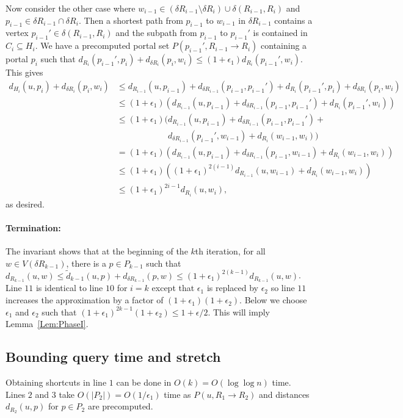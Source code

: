 \documentclass[11pt]{article}
\begin{document}
Now consider the other case where $w_{i-1}\in (\delta R_{i-1}\setminus\delta R_i)\cup\delta(R_{i-1},R_i)$ and $p_{i-1}\in\delta R_{i-1}\cap\delta R_i$. Then a shortest path from $p_{i-1}$ to $w_{i-1}$ in $\delta R_{i-1}$ contains a vertex $p_{i-1}'\in\delta(R_{i-1},R_i)$ and the subpath from $p_{i-1}$ to $p_{i-1}'$ is contained in $C_i\subseteq H_i$. We have a precomputed portal set $P(p_{i-1}',R_{i-1}\rightarrow R_i)$ containing a portal $p_i$ such that $d_{R_i}(p_{i-1}',p_i) + d_{\delta R_i}(p_i,w_i) \leq (1+\epsilon_1)d_{R_i}(p_{i-1}',w_i)$. This gives
\begin{align*}
  d_{H_i}(u,p_i) + d_{\delta R_i}(p_i,w_i) & \leq d_{R_{i-1}}(u,p_{i-1}) + d_{\delta R_{i-1}}(p_{i-1},p_{i-1}') + d_{R_i}(p_{i-1}',p_i) + d_{\delta R_i}(p_i,w_i)\\
  & \leq (1+\epsilon_1)(d_{R_{i-1}}(u,p_{i-1}) + d_{\delta R_{i-1}}(p_{i-1},p_{i-1}') + d_{R_i}(p_{i-1}',w_i))\\
  & \leq (1+\epsilon_1)(d_{R_{i-1}}(u,p_{i-1}) + d_{\delta R_{i-1}}(p_{i-1},p_{i-1}') +{}\\
  & \phantom{{}\leq  (1+\epsilon_1)(}d_{\delta R_{i-1}}(p_{i-1}',w_{i-1}) + d_{R_i}(w_{i-1},w_i))\\
  & =    (1+\epsilon_1)(d_{R_{i-1}}(u,p_{i-1}) + d_{\delta R_{i-1}}(p_{i-1},w_{i-1}) + d_{R_i}(w_{i-1},w_i))\\
  & \leq (1+\epsilon_1)((1+\epsilon_1)^{2(i-1)}d_{R_{i-1}}(u,w_{i-1}) + d_{R_i}(w_{i-1},w_i))\\
  & \leq (1+\epsilon_1)^{2i-1}d_{R_i}(u,w_i),
\end{align*}
as desired.

\paragraph{Termination:} The invariant shows that at the beginning of the $k$th iteration, for all $w\in V(\delta R_{k-1})$, there is a $p\in P_{k-1}$ such that $d_{R_{k-1}}(u,w)\leq \tilde{d}_{k-1}(u,p) + d_{\delta R_{k-1}}(p,w)\leq (1+\epsilon_1)^{2(k-1)}d_{R_{k-1}}(u,w)$. Line $11$ is identical to line $10$ for $i = k$ except that $\epsilon_1$ is replaced by $\epsilon_2$ so line $11$ increases the approximation by a factor of $(1+\epsilon_1)(1+\epsilon_2)$. Below we choose $\epsilon_1$ and $\epsilon_2$ such that $(1+\epsilon_1)^{2k-1}(1+\epsilon_2)\leq 1 + \epsilon/2$. This will imply Lemma~\ref{Lem:PhaseI}.



\subsection{Bounding query time and stretch}\label{subsec:TimeStretch}
Obtaining shortcuts in line $1$ can be done in $O(k) = O(\log\log n)$ time. Lines $2$ and $3$ take $O(|P_2|) = O(1/\epsilon_1)$ time as $P(u,R_1\rightarrow R_2)$ and distances $d_{R_2}(u,p)$ for $p\in P_2$ are precomputed.
\end{document}
